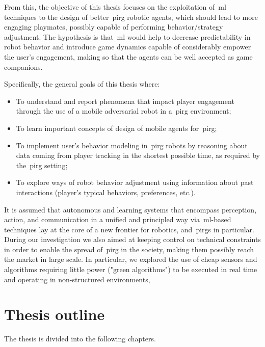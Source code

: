 From this, the objective of this thesis focuses on the exploitation of~\gls{ml} techniques to the design of better~\gls{pirg} robotic agents, which should lead to more engaging playmates, possibly capable of performing behavior/strategy adjustment. The hypothesis is that~\gls{ml} would help to decrease predictability in robot behavior and introduce game dynamics capable of considerably empower the user’s engagement, making so that the agents can be well accepted as game companions.

Specifically, the general goals of this thesis where:

\begin{itemize}
\item To understand and report phenomena that impact player engagement through the use of a mobile adversarial robot in a~\gls{pirg} environment;
\item To learn important concepts of design of mobile agents for~\gls{pirg};
\item To implement user's behavior modeling in~\gls{pirg} robots by reasoning about data coming from player tracking in the shortest possible time, as required by the~\gls{pirg} setting;
\item To explore ways of robot behavior adjustment using information about past interactions (player's typical behaviors, preferences, etc.).
\end{itemize}

It is assumed that autonomous and learning systems that encompass perception, action, and communication in a unified and principled way via~\gls{ml}-based techniques lay at the core of a new frontier for robotics, and~\gls{pirg}s in particular. During our investigation we also aimed at keeping control on technical constraints in order to enable the spread of~\gls{pirg} in the society, making them possibly reach the market in large scale. In particular, we explored the use of cheap sensors and algorithms requiring little power ("green algorithms") to be executed in real time and operating in non-structured environments, 

\section{Thesis outline}
The thesis is divided into the following chapters.

